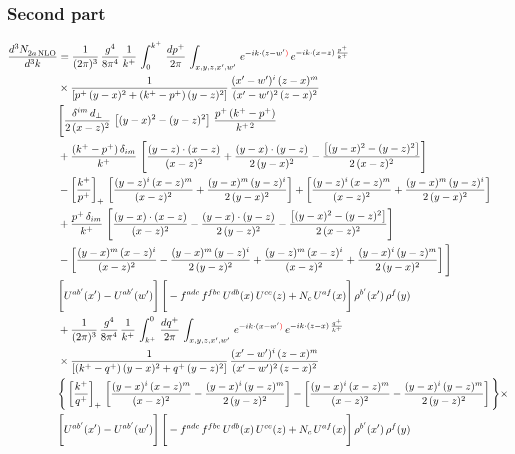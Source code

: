 \documentclass[9pt]{article}
\numberwithin{equation}{section}
\begin{document}
\subsubsection*{Second part}
\begin{align}
    \frac{d^{3}N_{2a\,\rm NLO}^{\rm}}{d^{3}k}  & =  \frac{1}{(2\pi)^{3}}\, \frac{g^{4}}{8\pi^{4}}\,\frac{1}{k^{+}}\,\int_{0}^{k^{+}}\, \frac{dp^{+}}{2\pi}\,\int_{x,y,z,x',w'}\, e^{-ik\cdot(z-w'{\color{red})}}\,e^{-ik\cdot (x-z)\,\frac{p^{+}}{k^{+}}}\notag \\ & \times\frac{1}{\left[p^{+}\,(y-x)^{2}+(k^{+}-p^{+})\,(y-z)^{2}\right]}\, \frac{(x'-w')^{i}\,(z-x)^{m}}{(x'-w')^{2}\,(z-x)^{2}} \notag \\ & \Bigg[\frac{\delta^{im}\,d_{\perp}}{2\,(x-z)^{2}}\,\left[(y-x)^{2}-(y-z)^{2}\right]\,\frac{p^{+}\,(k^{+}-p^{+})}{k^{+\,2}}\notag \\ & +\frac{(k^{+}-p^{+})\,\delta_{im}}{k^{+}}\,\left[\frac{(y-z)\cdot (x-z)}{(x-z)^{2}}+\frac{(y-x)\cdot (y-z)}{2\,(y-x)^{2}}-\frac{\left[(y-x)^{2}-(y-z)^{2}\right]}{2\,(x-z)^{2}}\right]\notag \\ & -\left[\frac{k^{+}}{p^{+}}\right]_{+}\,\left[\frac{(y-z)^{i}\,(x-z)^{m}}{(x-z)^{2}}+\frac{(y-x)^{m}\,(y-z)^{i}}{2\,(y-x)^{2}}\right]+ \left[\frac{(y-z)^{i}\,(x-z)^{m}}{(x-z)^{2}}+\frac{(y-x)^{m}\,(y-z)^{i}}{2\,(y-x)^{2}}\right]\notag \\ & +\frac{p^{+}\,\delta_{im}}{k^{+}}\,\left[\frac{(y-x)\cdot (x-z)}{(x-z)^{2}}-\frac{(y-x)\cdot (y-z)}{2\,(y-z)^{2}}-\frac{\left[(y-x)^{2}-(y-z)^{2}\right]}{2\,(x-z)^{2}}\right]\notag \\ &-\left[\frac{(y-x)^{m}\,(x-z)^{i}}{(x-z)^{2}}-\frac{(y-x)^{m}\,(y-z)^{i}}{2\,(y-z)^{2}}+\frac{(y-z)^{m}\,(x-z)^{i}}{(x-z)^{2}}+\frac{(y-x)^{i}\,(y-z)^{m}}{2\,(y-x)^{2}}\right]\Bigg] \notag \\ & \Bigg[U^{ab'}(x')-U^{ab'}(w')\Bigg]\,\Bigg[-f^{adc}\,f^{fbe}\,U^{db}(x)\,U^{ce}(z)+N_{c}\,U^{af}(x)\Bigg]\,\rho^{b'}(x')\,\rho^{f}(y)\notag \\ & + \frac{1}{(2\pi)^{3}}\,\frac{g^{4}}{8\pi^{4}}\,\frac{1}{k^{+}}\, \int^{0}_{k^{+}}\, \frac{dq^{+}}{2\pi} \,  \int_{x,y,z,x',w'}\,e^{-ik\cdot(x-w'{\color{red})}}\,e^{-ik\cdot (z-x)\,\frac{q^{+}}{k^{+}}}\notag \\ & \times\frac{1}{\left[(k^{+}-q^{+})\,(y-x)^{2}+q^{+}\,(y-z)^{2}\right]}\, \frac{(x'-w')^{i}\,(z-x)^{m}}{(x'-w')^{2}\,(z-x)^{2}} \notag \\ &\Bigg\{\left[\frac{k^{+}}{q^{+}}\right]_{+}\,\left[\frac{(y-x)^{i}\,(x-z)^{m}}{(x-z)^{2}}-\frac{(y-x)^{i}\,(y-z)^{m}}{2\,(y-z)^{2}}\right] -\left[\frac{(y-x)^{i}\,(x-z)^{m}}{(x-z)^{2}}-\frac{(y-x)^{i}\,(y-z)^{m}}{2\,(y-z)^{2}}\right]\Bigg\}\times\,\notag \\ & \Bigg[U^{ab'}(x')-U^{ab'}(w')\Bigg]\,\Bigg[-f^{adc}\,f^{fbe}\,U^{db}(x)\,U^{ce}(z)+N_{c}\,U^{af}(x)\Bigg]\,\rho^{b'}(x')\,\rho^{f}(y)

\end{align}
\end{document}
